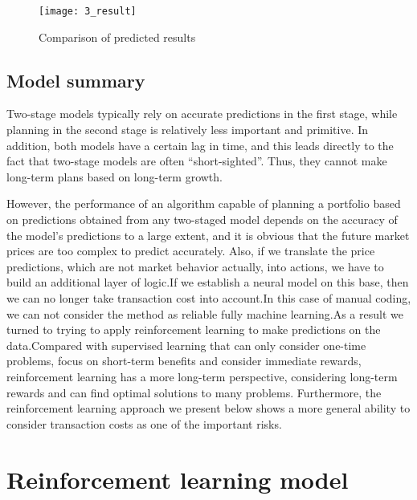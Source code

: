 \documentclass{mcmthesis}
\begin{document}
\begin{figure}[H]
  \centering
  \texttt{[image: 3\_result]}
  \caption{Comparison of predicted results}
  \label{fig:prediction}
\end{figure}
\subsection{Model summary}


Two-stage models typically rely on accurate predictions in the first stage, while planning in the second stage is relatively less important and primitive. In addition, both models have a certain lag in time, and this leads directly to the fact that two-stage models are often ``short-sighted''. Thus, they cannot make long-term plans based on long-term growth.

However, the performance of an algorithm capable of planning a portfolio based on predictions obtained from any two-staged model depends on the accuracy of the model's predictions to a large extent, and it is obvious that the future market prices are too complex to predict accurately. Also, if we translate the price predictions, which are not market behavior actually, into actions, we have to build an additional layer of logic.If we establish a neural model on this base, then we can no longer take transaction cost into account.In this case of manual coding, we can not consider the method as reliable fully machine learning.As a result we turned to trying to apply reinforcement learning to make predictions on the data.Compared with supervised learning that can only consider one-time problems, focus on short-term benefits and consider immediate rewards, reinforcement learning has a more long-term perspective, considering long-term rewards and can find optimal solutions to many problems. Furthermore, the reinforcement learning approach we present below shows a more general ability to consider transaction costs as one of the important risks.




\section{Reinforcement learning model}
\end{document}
